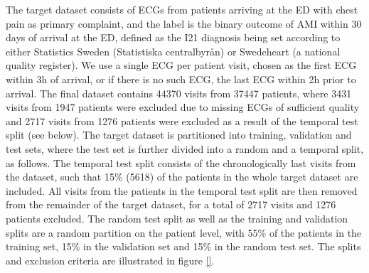 \documentclass[journal,twoside,web]{ieeecolor}
\begin{document}
The target dataset consists of ECGs from patients arriving at the ED with chest pain as primary complaint, and the label is the binary outcome of AMI within 30 days of arrival at the ED, defined as the I21 diagnosis being set according to either Statistics Sweden (Statistiska centralbyrån) or Swedeheart (a national quality register). We use a single ECG per patient visit, chosen as the first ECG within 3h of arrival, or if there is no such ECG, the last ECG within 2h prior to arrival. The final dataset contains 44370 visits from  37447 patients, where 3431 visits from 1947 patients were excluded due to missing ECGs of sufficient quality and 2717 visits from 1276 patients were excluded as a result of the temporal test split (see below). The target dataset is partitioned into training, validation and test sets, where the test set is further divided into a random and a temporal split, as follows. The temporal test split consists of the chronologically last visits from the dataset, such that 15\% (5618) of the patients in the whole target dataset are included. All visits from the patients in the temporal test split are then removed from the remainder of the target dataset, for a total of 2717 visits and 1276 patients excluded. The random test split as well as the training and validation splits are a random partition on the patient level, with 55\% of the patients in the training set, 15\% in the validation set and 15\% in the random test set. The splits and exclusion criteria are illustrated in figure \ref{}. 


\end{document}
